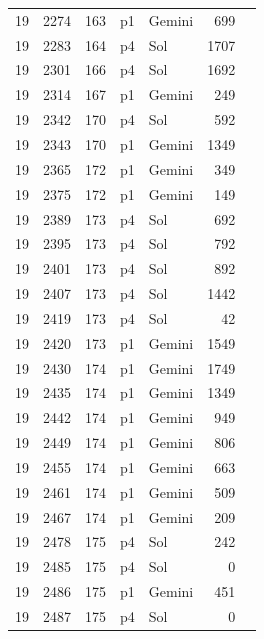 \begin{longtable}{r r r l l r L{2.2in}}
19 & 2274 & 163 & p1 & Gemini & 699 &  \\
19 & 2283 & 164 & p4 & Sol & 1707 &  \\
19 & 2301 & 166 & p4 & Sol & 1692 &  \\
19 & 2314 & 167 & p1 & Gemini & 249 &  \\
19 & 2342 & 170 & p4 & Sol & 592 &  \\
19 & 2343 & 170 & p1 & Gemini & 1349 &  \\
19 & 2365 & 172 & p1 & Gemini & 349 &  \\
19 & 2375 & 172 & p1 & Gemini & 149 &  \\
19 & 2389 & 173 & p4 & Sol & 692 &  \\
19 & 2395 & 173 & p4 & Sol & 792 &  \\
19 & 2401 & 173 & p4 & Sol & 892 &  \\
19 & 2407 & 173 & p4 & Sol & 1442 &  \\
19 & 2419 & 173 & p4 & Sol & 42 &  \\
19 & 2420 & 173 & p1 & Gemini & 1549 &  \\
19 & 2430 & 174 & p1 & Gemini & 1749 &  \\
19 & 2435 & 174 & p1 & Gemini & 1349 &  \\
19 & 2442 & 174 & p1 & Gemini & 949 &  \\
19 & 2449 & 174 & p1 & Gemini & 806 &  \\
19 & 2455 & 174 & p1 & Gemini & 663 &  \\
19 & 2461 & 174 & p1 & Gemini & 509 &  \\
19 & 2467 & 174 & p1 & Gemini & 209 &  \\
19 & 2478 & 175 & p4 & Sol & 242 &  \\
19 & 2485 & 175 & p4 & Sol & 0 &  \\
19 & 2486 & 175 & p1 & Gemini & 451 &  \\
19 & 2487 & 175 & p4 & Sol & 0 &  \\
\end{longtable}
\endgroup
{}
